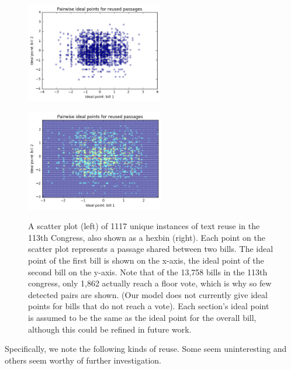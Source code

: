 \documentclass{article}
\begin{document}
\begin{figure}[h]
\centering
\begin{minipage}{.5\textwidth}
  \centering
  \includegraphics[width=6cm]{scatter.png}
  \label{fig:reuse1}
\end{minipage}%
\begin{minipage}{.5\textwidth}
  \centering
  \includegraphics[width=6cm]{hex.png}
  \label{fig:reuse2}
\end{minipage}
\caption{A scatter plot (left) of 1117 unique instances of text reuse in the 113th Congress, also shown as a hexbin (right). Each point on the scatter plot represents a passage shared between two bills. The ideal point of the first bill is shown on the x-axis, the ideal point of the second bill on the y-axis.
Note that of the 13,758 bills in the 113th congress, only 1,862 actually reach a floor vote, which is why so few detected pairs are shown. (Our model does not currently give ideal points for bills that do not reach a vote). Each section's ideal point is assumed to be the same as the ideal point for the overall bill, although this could be refined in future work.}
\end{figure}

Specifically, we note the following kinds of reuse. Some seem uninteresting and others seem worthy of further investigation.
\end{document}
